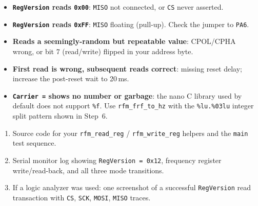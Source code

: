 \documentclass[11pt,letterpaper]{article}
\begin{document}
\begin{tcolorbox}[warning={Troubleshooting}]
	\begin{itemize}[leftmargin=1.2em]
		\item \textbf{\texttt{RegVersion} reads \texttt{0x00}}: \texttt{MISO} not connected, or \texttt{CS} never asserted.
		\item \textbf{\texttt{RegVersion} reads \texttt{0xFF}}: \texttt{MISO} floating (pull-up). Check the jumper to \texttt{PA6}.
		\item \textbf{Reads a seemingly-random but repeatable value}: \mbox{CPOL}/\mbox{CPHA} wrong, or bit 7 (read/write) flipped in your address byte.
		\item \textbf{First read is wrong, subsequent reads correct}: missing reset delay; increase the post-reset wait to 20\,ms.
		\item \textbf{\texttt{Carrier =} shows no number or garbage}: the nano C library used by default does not support \texttt{\%f}. Use \texttt{rfm\_frf\_to\_hz} with the \texttt{\%lu.\%03lu} integer split pattern shown in Step~6.
	\end{itemize}
\end{tcolorbox}

\begin{tcolorbox}[deliverable={Lab Handout 1-C Deliverable}]
	\begin{enumerate}[leftmargin=1.2em]
		\item Source code for your \texttt{rfm\_read\_reg} / \texttt{rfm\_write\_reg} helpers and the \texttt{main} test sequence.
		\item Serial monitor log showing \texttt{RegVersion = 0x12}, frequency register write/read-back, and all three mode transitions.
		\item If a logic analyzer was used: one screenshot of a successful \texttt{RegVersion} read transaction with \texttt{CS}, \texttt{SCK}, \texttt{MOSI}, \texttt{MISO} traces.
	\end{enumerate}
\end{tcolorbox}

\printhandoutglossary
\end{document}
